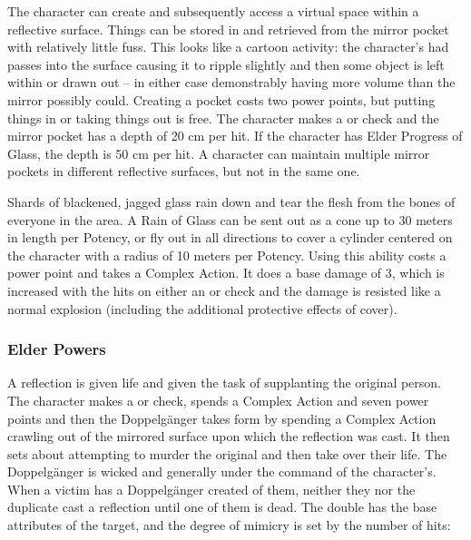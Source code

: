  The character can create and subsequently access a virtual space within a reflective surface. Things can be stored in and retrieved from the mirror pocket with relatively little fuss. This looks like a cartoon activity: the character's had passes into the surface causing it to ripple slightly and then some object is left within or drawn out -- in either case demonstrably having more volume than the mirror possibly could. Creating a pocket costs two power points, but putting things in or taking things out is free. The character makes a  or  check and the mirror pocket has a depth of 20 cm per hit. If the character has Elder Progress of Glass, the depth is 50 cm per hit. A character can maintain multiple mirror pockets in different reflective surfaces, but not in the same one.

 Shards of blackened, jagged glass rain down and tear the flesh from the bones of everyone in the area. A Rain of Glass can be sent out as a cone up to 30 meters in length per Potency, or fly out in all directions to cover a cylinder centered on the character with a radius of 10 meters per Potency. Using this ability costs a power point and takes a Complex Action. It does a base damage of 3, which is increased with the hits on either an  or  check and the damage is resisted like a normal explosion (including the additional protective effects of cover).


\subsubsection{Elder Powers}

 A reflection is given life and given the task of supplanting the original person. The character makes a  or  check, spends a Complex Action and seven power points and then the Doppelg\"{a}nger takes form by spending a Complex Action crawling out of the mirrored surface upon which the reflection was cast. It then sets about attempting to murder the original and then take over their life. The Doppelg\"{a}nger is wicked and generally under the command of the character's. When a victim has a Doppelg\"{a}nger created of them, neither they nor the duplicate cast a reflection until one of them is dead. The double has the base attributes of the target, and the degree of mimicry is set by the number of hits:


